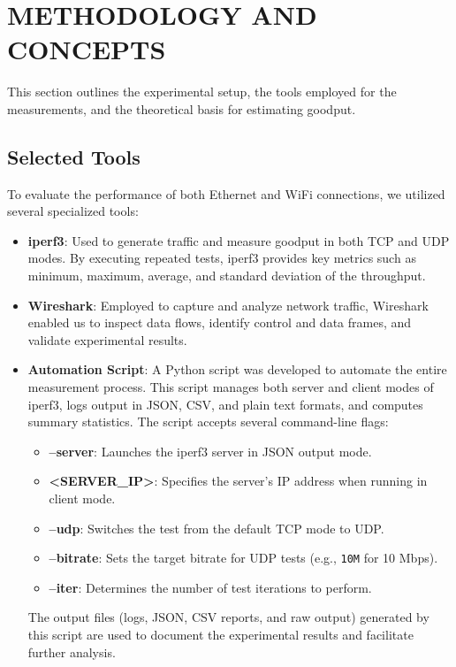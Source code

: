 
\section{METHODOLOGY AND CONCEPTS} \label{sec:methodology-and-concepts}

This section outlines the experimental setup, the tools employed for the measurements, and the theoretical basis for estimating goodput.

\subsection{Selected Tools} \label{subsec:selected-tools}

To evaluate the performance of both Ethernet and WiFi connections, we utilized several specialized tools:

\begin{itemize}
    \item \textbf{iperf3}: Used to generate traffic and measure goodput in both TCP and UDP modes. By executing repeated tests, iperf3 provides key metrics such as minimum, maximum, average, and standard deviation of the throughput.
    \item \textbf{Wireshark}: Employed to capture and analyze network traffic, Wireshark enabled us to inspect data flows, identify control and data frames, and validate experimental results.
    \item \textbf{Automation Script}: A Python script was developed to automate the entire measurement process. This script manages both server and client modes of iperf3, logs output in JSON, CSV, and plain text formats, and computes summary statistics. The script accepts several command-line flags:
    \begin{itemize}
        \item \textbf{--server}: Launches the iperf3 server in JSON output mode.
        \item \textbf{<SERVER\_IP>}: Specifies the server's IP address when running in client mode.
        \item \textbf{--udp}: Switches the test from the default TCP mode to UDP.
        \item \textbf{--bitrate}: Sets the target bitrate for UDP tests (e.g., \texttt{10M} for 10 Mbps).
        \item \textbf{--iter}: Determines the number of test iterations to perform.
    \end{itemize}
    The output files (logs, JSON, CSV reports, and raw output) generated by this script are used to document the experimental results and facilitate further analysis.
\end{itemize}

